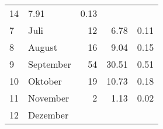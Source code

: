\begin{longtable}{lXrrr}
       \num{14} &
       \num[round-mode=places,round-precision=2]{7,91} &
         \num[round-mode=places,round-precision=2]{0,13} \\

     7 &
     \multicolumn{1}{X}{ Juli   } &


       \num{12} &
       \num[round-mode=places,round-precision=2]{6,78} &
         \num[round-mode=places,round-precision=2]{0,11} \\

     8 &
     \multicolumn{1}{X}{ August   } &


       \num{16} &
       \num[round-mode=places,round-precision=2]{9,04} &
         \num[round-mode=places,round-precision=2]{0,15} \\

     9 &
     \multicolumn{1}{X}{ September   } &


       \num{54} &
       \num[round-mode=places,round-precision=2]{30,51} &
         \num[round-mode=places,round-precision=2]{0,51} \\

     10 &
     \multicolumn{1}{X}{ Oktober   } &


       \num{19} &
       \num[round-mode=places,round-precision=2]{10,73} &
         \num[round-mode=places,round-precision=2]{0,18} \\

     11 &
     \multicolumn{1}{X}{ November   } &


       \num{2} &
       \num[round-mode=places,round-precision=2]{1,13} &
         \num[round-mode=places,round-precision=2]{0,02} \\

     12 &
     \multicolumn{1}{X}{ Dezember   } &



\end{longtable}
